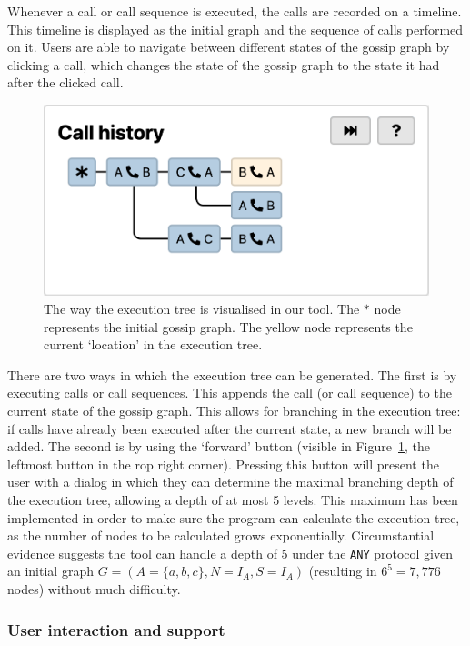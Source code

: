 Whenever a call or call sequence is executed, the calls are recorded on a timeline.
This timeline is displayed as the initial graph and the sequence of calls performed on it.
Users are able to navigate between different states of the gossip graph by clicking a call,
which changes the state of the gossip graph to the state it had after the clicked call.

\begin{figure}[htb!]
    \includegraphics[width=\linewidth]{img/execution-tree.png}
    \caption{The way the execution tree is visualised in our tool. The \(*\) node represents the initial gossip graph. The yellow node represents the current `location' in the execution tree.}
    \label{fig:execution-tree}
\end{figure}

There are two ways in which the execution tree can be generated.
The first is by executing calls or call sequences.
This appends the call (or call sequence) to the current state of the gossip graph.
This allows for branching in the execution tree:
if calls have already been executed after the current state, a new branch will be added.
The second is by using the `forward' button (visible in Figure~\ref{fig:execution-tree}, the leftmost button in the rop right corner).
Pressing this button will present the user with a dialog in which they can determine the maximal branching depth of the execution tree, allowing a depth of at most 5 levels.
This maximum has been implemented in order to make sure the program can calculate the execution tree, as the number of nodes to be calculated grows exponentially.
Circumstantial evidence suggests the tool can handle a depth of 5 under the \texttt{ANY} protocol given an initial graph \(G = (A = \{a, b, c\}, N = I_A, S = I_A)\) (resulting in \(6^5 = 7,776\) nodes) without much difficulty.

\subsubsection{User interaction and support}

